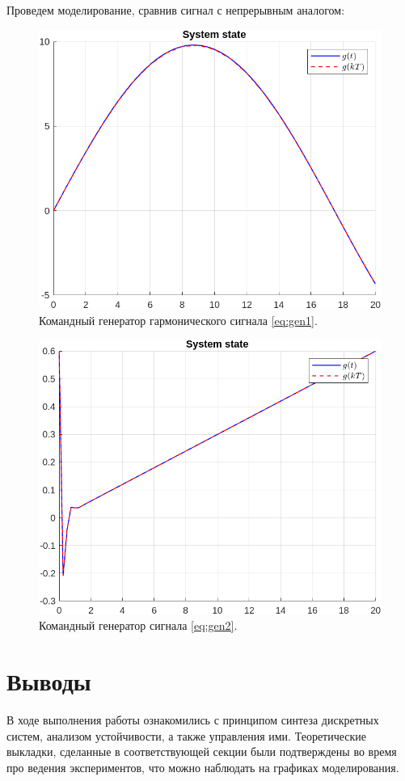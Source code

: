 \documentclass[a4paper, 14pt]{extarticle}
\theoremstyle{definition}
\theoremstyle{plain}
\theoremstyle{remark}
\begin{document}
Проведем моделирование, сравнив сигнал с непрерывным аналогом:
\begin{figure}
    [H]
    \centering
    \includegraphics[width=350pt]{images/task3_state_1.png}
    \caption{Командный генератор гармонического сигнала \ref{eq:gen1}.}
\end{figure}
\begin{figure}
    [H]
    \centering
    \includegraphics[width=350pt]{images/task3_state_2.png}
    \caption{Командный генератор сигнала \ref{eq:gen2}.}
\end{figure}

\section{Выводы}
В ходе выполнения работы ознакомились с принципом синтеза дискретных систем, анализом устойчивости, а также управления ими. Теоретические выкладки, сделанные в соответствующей секции были подтверждены во время про ведения экспериментов, что можно наблюдать на графиках моделирования.
\end{document}

